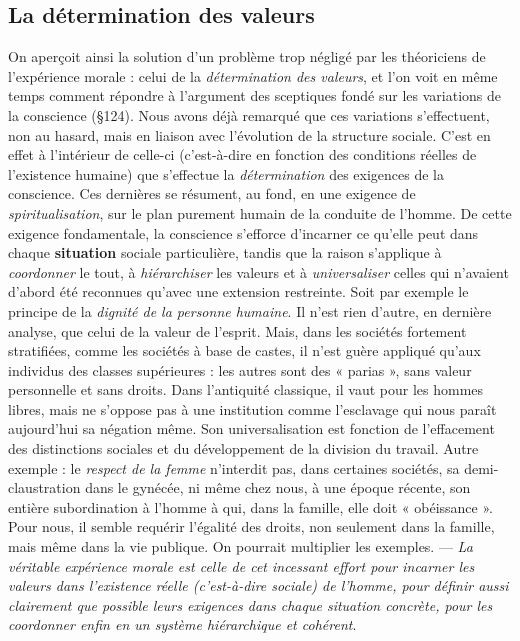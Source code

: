 \subsection{La détermination des valeurs}%
On aperçoit ainsi la solution
d’un problème trop négligé par les théoriciens de l’expérience
morale : celui de la {\it détermination des valeurs}, et l’on voit en même
temps comment répondre à l’argument des sceptiques fondé sur les
variations de la conscience (\S 124). Nous avons déjà remarqué que
ces variations s’effectuent, non au hasard, mais en liaison avec l’évolution
de la structure sociale. C’est en effet à l’intérieur de celle-ci
(c’est-à-dire en fonction des conditions réelles de l’existence humaine)
que s’effectue la {\it détermination} des exigences de la conscience. Ces
dernières se résument, au fond, en une exigence de {\it spiritualisation},
sur le plan purement humain de la conduite de l’homme. De cette
exigence fondamentale, la conscience s’efforce d’incarner ce qu’elle
peut dans chaque {\bf situation} sociale particulière, tandis que la raison
s'applique à {\it coordonner} le tout, à {\it hiérarchiser} les valeurs et à
{\it universaliser}
celles qui n’avaient d’abord été reconnues qu'avec une extension
restreinte. Soit par exemple le principe de la {\it dignité de la personne
humaine}. Il n’est rien d’autre, en dernière analyse, que celui
de la valeur de l’esprit. Mais, dans les sociétés fortement stratifiées,
comme les sociétés à base de castes, il n’est guère appliqué qu’aux
individus des classes supérieures : les autres sont des « parias », sans
valeur personnelle et sans droits. Dans l’antiquité classique, il vaut
pour les hommes libres, mais ne s’oppose pas à une institution comme
l’esclavage qui nous paraît aujourd’hui sa négation même. Son universalisation
est fonction de l'effacement des distinctions sociales et
du développement de la division du travail. Autre exemple : le {\it respect
de la femme} n’interdit pas, dans certaines sociétés, sa demi-claustration
dans le gynécée, ni même chez nous, à une époque récente, son
entière subordination à l’homme à qui, dans la famille, elle doit
« obéissance ». Pour nous, il semble requérir l’égalité des droits, non
seulement dans la famille, mais même dans la vie publique. On pourrait
multiplier les exemples. — {\it La véritable expérience morale est celle
de cet incessant effort pour incarner les valeurs dans l'existence réelle
(c'est-à-dire sociale) de l’homme, pour définir aussi clairement que
possible leurs exigences dans chaque situation concrète, pour les coordonner
enfin en un système hiérarchique et cohérent}.

